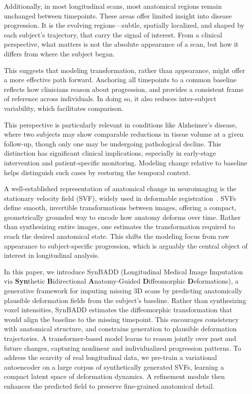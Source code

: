 Additionally, in most longitudinal scans, most anatomical regions remain unchanged between timepoints. These areas offer limited insight into disease progression. It is the evolving regions—subtle, spatially localized, and shaped by each subject’s trajectory, that carry the signal of interest. From a clinical perspective, what matters is not the absolute appearance of a scan, but how it differs from where the subject began.

This suggests that modeling transformation, rather than appearance, might offer a more effective path forward. Anchoring all timepoints to a common baseline reflects how clinicians reason about progression, and provides a consistent frame of reference across individuals. In doing so, it also reduces inter-subject variability, which facilitates comparison.

This perspective is particularly relevant in conditions like Alzheimer’s disease, where two subjects may show comparable reductions in tissue volume at a given follow-up, though only one may be undergoing pathological decline. This distinction has significant clinical implications, especially in early-stage intervention and patient-specific monitoring. Modeling change relative to baseline helps distinguish such cases by restoring the temporal context.

A well-established representation of anatomical change in neuroimaging is the stationary velocity field (SVF), widely used in deformable registration~\cite{ashburner2007fast, modat2012, fishbaugh2020}. SVFs define smooth, invertible transformations between images, offering a compact, geometrically grounded way to encode how anatomy deforms over time. Rather than synthesizing entire images, one estimates the transformation required to reach the desired anatomical state. This shifts the modeling focus from raw appearance to subject-specific progression, which is arguably the central object of interest in longitudinal analysis.

\vspace{0.5em}

In this paper, we introduce SynBADD (Longitudinal Medical Image Imputation via \textbf{Syn}thetic \textbf{B}idirectional \textbf{A}natomy-Guided \textbf{D}iffeomorphic \textbf{D}eformations), a generative framework for imputing missing 3D scans by predicting anatomically plausible deformation fields from the subject’s baseline. Rather than synthesizing voxel intensities, SynBADD estimates the diffeomorphic transformation that would align the baseline to the missing timepoint. This encourages consistency with anatomical structure, and constrains generation to plausible deformation trajectories. A transformer-based model learns to reason jointly over past and future changes, capturing nonlinear and individualized progression patterns. To address the scarcity of real longitudinal data, we pre-train a variational autoencoder on a large corpus of synthetically generated SVFs, learning a compact latent space of deformation dynamics. A refinement module then enhances the predicted field to preserve fine-grained anatomical detail.

